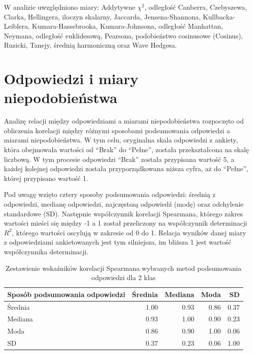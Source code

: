 \documentclass{amuthesis}
\begin{document}
W analizie uwzględniono miary: Addytywne \(\chi^2\), odległość Canberra,
Czebyszewa, Clarka, Hellingera, iloczyn skalarny, Jaccarda,
Jensena-Shannona, Kullbacka-Leiblera, Kumara-Hassebrooka,
Kumara-Johnsona, odległość Manhattan, Neymana, odległość euklidesową,
Pearsona, podobieństwo cosinusowe (Cosinus), Ruzicki, Tanejy, średnią
harmoniczną oraz Wave Hedgesa.

\hypertarget{odpowiedzi-i-miary-niepodobieux144stwa}{%
\section{Odpowiedzi i miary
niepodobieństwa}\label{odpowiedzi-i-miary-niepodobieux144stwa}}

Analizę relacji między odpowiedziami a miarami niepodobieństwa
rozpoczęto od obliczenia korelacji między różnymi sposobami podsumowania
odpowiedzi a miarami niepodobieństwa. W tym celu, oryginalna skala
odpowiedzi z ankiety, która obejmowała wartości od ``Brak'' do
``Pełne'', została przekształcona na skalę liczbową. W tym procesie
odpowiedzi ``Brak'' została przypisana wartość 5, a każdej kolejnej
odpowiedzi została przyporządkowana niższa cyfra, aż do ``Pełne'',
której przypisano wartość 1.

Pod uwagę wzięto cztery sposoby podsumowania odpowiedzi: średnią z
odpowiedzi, medianę odpowiedzi, najczęstszą odpowiedź (modę) oraz
odchylenie standardowe (SD). Następnie współczynnik korelacji Spearmana,
którego zakres wartości mieści się między -1 a 1 został przeliczony na
współczynnik determinacji \(R^2\), którego wartości oscylują w zakresie
od 0 do 1. Relacja wyników danej miary z odpowiedziami ankietowanych
jest tym silniejsza, im bliższa 1 jest wartość współczynnika
determinacji.

\hypertarget{tbl-mc2_cors}{}
\begin{table}
\caption{\label{tbl-mc2_cors}Zestawienie wskaźników korelacji Spearmana wybranych metod podsumowania
odpowiedzi dla 2 klas }\tabularnewline

\centering
\begin{tabular}{lrrrr}
\toprule
Sposób podsumowania
odpowiedzi & Średnia & Mediana & Moda & SD\\
\midrule
Średnia & 1.00 & 0.93 & 0.86 & 0.37\\
Mediana & 0.93 & 1.00 & 0.90 & 0.23\\
Moda & 0.86 & 0.90 & 1.00 & 0.06\\
SD & 0.37 & 0.23 & 0.06 & 1.00\\
\bottomrule
\end{tabular}
\end{table}
\end{document}
